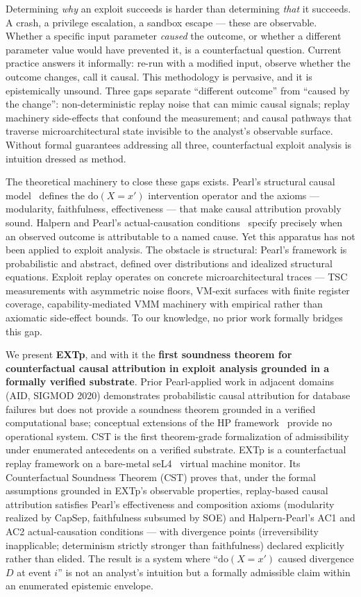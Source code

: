 \documentclass[conference]{IEEEtran}
\newcommand{\dox}[1]{\text{do}(X{=}#1)}
\begin{document}
Determining \emph{why} an exploit succeeds is harder than determining
\emph{that} it succeeds. A crash, a privilege escalation, a sandbox
escape --- these are observable. Whether a specific input parameter
\emph{caused} the outcome, or whether a different parameter value
would have prevented it, is a counterfactual question. Current
practice answers it informally: re-run with a modified input, observe
whether the outcome changes, call it causal. This methodology is
pervasive, and it is epistemically unsound. Three gaps separate
``different outcome'' from ``caused by the change'':
non-deterministic replay noise that can mimic causal signals; replay
machinery side-effects that confound the measurement; and causal
pathways that traverse microarchitectural state invisible to the
analyst's observable surface. Without formal guarantees addressing
all three, counterfactual exploit analysis is intuition dressed as
method.

The theoretical machinery to close these gaps exists. Pearl's
structural causal model~\cite{pearl2009causality} defines the
$\dox{x'}$ intervention operator and the axioms --- modularity,
faithfulness, effectiveness --- that make causal attribution provably
sound. Halpern and Pearl's actual-causation
conditions~\cite{halpern2005causes} specify precisely when an
observed outcome is attributable to a named cause. Yet this apparatus
has not been applied to exploit analysis. The obstacle is structural:
Pearl's framework is probabilistic and abstract, defined over
distributions and idealized structural equations. Exploit replay
operates on concrete microarchitectural traces --- TSC measurements
with asymmetric noise floors, VM-exit surfaces with finite register
coverage, capability-mediated VMM machinery with empirical rather
than axiomatic side-effect bounds. To our knowledge, no prior work
formally bridges this gap.

We present \textbf{EXTp}, and with it the \textbf{first soundness
theorem for counterfactual causal attribution in exploit analysis
grounded in a formally verified substrate}. Prior Pearl-applied
work in adjacent domains~\cite{fariha2020aid} (AID, SIGMOD 2020)
demonstrates probabilistic causal attribution for database failures
but does not provide a soundness theorem grounded in a verified
computational base; conceptual extensions of the HP
framework~\cite{soloviev2021nested} provide no operational system.
CST is the first theorem-grade formalization of admissibility
under enumerated antecedents on a verified substrate. EXTp is a
counterfactual replay framework on a bare-metal
seL4~\cite{klein2009sel4} virtual machine monitor. Its Counterfactual
Soundness Theorem (CST) proves that, under the formal assumptions
grounded in EXTp's observable properties, replay-based causal
attribution satisfies Pearl's effectiveness and composition axioms
(modularity realized by CapSep, faithfulness subsumed by SOE) and
Halpern-Pearl's AC1 and AC2 actual-causation conditions --- with
divergence points (irreversibility inapplicable; determinism strictly
stronger than faithfulness) declared explicitly rather than elided.
The result is a system where ``$\dox{x'}$ caused divergence $D$ at
event $i$'' is not an analyst's intuition but a formally admissible
claim within an enumerated epistemic envelope.
\end{document}
